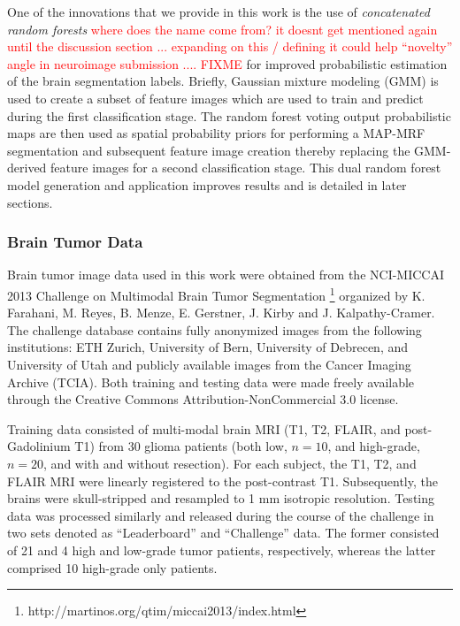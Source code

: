 \documentclass[final,5p,times,twocolumn]{elsarticle}
\begin{document}
One of the innovations that we provide in this work is
the use of \textit{concatenated random forests} \textcolor{red}{where
  does the name come from?  it doesnt get mentioned again until the
  discussion section ... expanding on this / defining it could help
  ``novelty'' angle in neuroimage submission .... FIXME} for improved probabilistic estimation
of the brain segmentation labels.  Briefly, Gaussian mixture
modeling (GMM) is used to create a subset of feature images which are
used to train and predict during the first classification stage.  
The random forest voting output probabilistic maps are then used as 
spatial probability priors for performing a MAP-MRF segmentation
and subsequent feature image creation
thereby replacing the GMM-derived feature images for a second
classification stage.  This dual random forest model generation
and application
improves results and is detailed in later sections.




\subsubsection{Brain Tumor Data}

Brain tumor image data used in this work were obtained from the NCI-MICCAI 2013 
Challenge on Multimodal Brain Tumor Segmentation%
\footnote{
http://martinos.org/qtim/miccai2013/index.html
}
organized by K. Farahani, M. Reyes, B. Menze, E. Gerstner, J. Kirby and J. Kalpathy-Cramer. 
The challenge database contains fully anonymized images from the following institutions: 
ETH Zurich, University of Bern, University of Debrecen, and University of Utah and 
publicly available images from the Cancer Imaging Archive (TCIA).  Both training 
and testing data were made freely available through the Creative Commons Attribution-NonCommercial 3.0 license.

Training data consisted of multi-modal brain MRI (T1, T2, FLAIR, and 
post-Gadolinium T1) from 30 glioma patients (both low, $n=10$, and high-grade, $n=20$,
and with and without resection).  For each subject, the T1, T2, and 
FLAIR MRI were linearly registered to the post-contrast T1.  Subsequently,
the brains were skull-stripped and resampled to 1 mm isotropic resolution.
Testing data was processed similarly and released during the course of the
challenge in two sets denoted as ``Leaderboard'' and ``Challenge'' data.  
The former consisted of 21 and 4 high and low-grade tumor patients, respectively,
whereas the latter comprised 10 high-grade only patients.
\end{document}
